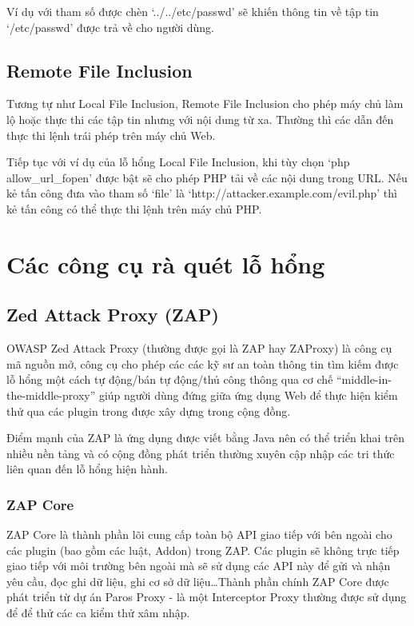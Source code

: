 \documentclass[./../main.tex]{subfiles}
\begin{document}
Ví dụ với tham số được chèn `../../etc/passwd' sẽ khiến thông tin về tập
tin `/etc/passwd' được trả về cho người dùng.

\subsection{Remote File Inclusion}

Tương tự như Local File Inclusion, Remote File Inclusion cho phép máy chủ
làm lộ hoặc thực thi các tập tin nhưng với nội dung từ xa. Thường thì các
dẫn đến thực thi lệnh trái phép trên máy chủ Web.

Tiếp tục với ví dụ của lỗ hổng Local File Inclusion, khi tùy chọn `php allow{\_}url{\_}fopen' được bật sẽ cho phép PHP tải về các nội dung trong URL. Nếu kẻ tấn công đưa vào tham số `file' là `http://attacker.example.com/evil.php' thì kẻ tấn công có thể thực thi lệnh trên máy chủ PHP.

\section{Các công cụ rà quét lỗ hổng}

\subsection{Zed Attack Proxy (ZAP)}
OWASP Zed Attack Proxy (thường được gọi là  ZAP hay ZAProxy) là công cụ mã nguồn mở,
công cụ cho phép các các kỹ sư an toàn thông tin tìm kiếm được lỗ hổng một cách tự
động/bán tự động/thủ công thông qua cơ chế “middle-in-the-middle-proxy” giúp người
dùng đứng giữa ứng dụng Web để thực hiện kiểm thử qua các plugin trong được xây dựng
trong cộng đồng.

Điểm mạnh của ZAP là ứng dụng được viết bằng Java nên có thể triển khai trên
nhiều nền tảng và có cộng đồng phát triển thường xuyên cập nhập các tri thức
liên quan đến lỗ hổng hiện hành.

\subsubsection{ZAP Core}

ZAP Core là thành phần lõi cung cấp toàn bộ API giao tiếp với bên ngoài cho các
plugin (bao gồm các luật, Addon) trong ZAP. Các plugin sẽ không trực tiếp giao tiếp
với môi trường bên ngoài mà sẽ sử dụng các API này để  gửi và nhận yêu cầu, đọc ghi
dữ liệu, ghi cơ sở dữ liệu\ldots Thành phần chính ZAP Core được phát triển từ dự án
Paros Proxy - là một Interceptor Proxy thường được sử dụng để để thử các ca kiểm thử
xâm nhập.
\end{document}
